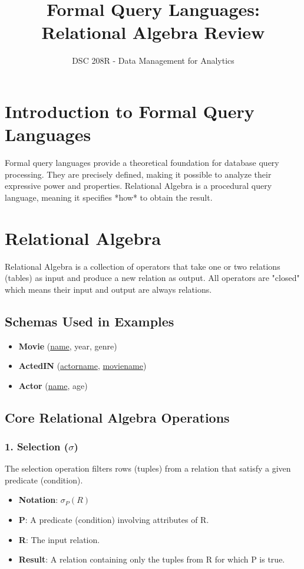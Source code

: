 \documentclass{article}
\title{Formal Query Languages: Relational Algebra Review}
\author{DSC 208R - Data Management for Analytics}
\date{}
\newcommand{\sel}{\sigma} %
\begin{document}
\maketitle

\section*{Introduction to Formal Query Languages}
Formal query languages provide a theoretical foundation for database query processing. They are precisely defined, making it possible to analyze their expressive power and properties. Relational Algebra is a procedural query language, meaning it specifies *how* to obtain the result.

\section*{Relational Algebra}
Relational Algebra is a collection of operators that take one or two relations (tables) as input and produce a new relation as output. All operators are "closed" which means their input and output are always relations.

\subsection*{Schemas Used in Examples}
\begin{itemize}
    \item \textbf{Movie} (\underline{name}, year, genre) 
    \item \textbf{ActedIN} (\underline{actorname}, \underline{moviename}) 
    \item \textbf{Actor} (\underline{name}, age) 
\end{itemize}

\subsection*{Core Relational Algebra Operations}

\subsubsection*{1. Selection ($\sel$)}
The selection operation filters rows (tuples) from a relation that satisfy a given predicate (condition).
\begin{itemize}
    \item \textbf{Notation}: $\sel_P(R)$ 
    \item \textbf{P}: A predicate (condition) involving attributes of R.
    \item \textbf{R}: The input relation.
    \item \textbf{Result}: A relation containing only the tuples from R for which P is true.
\end{itemize}
\end{document}
